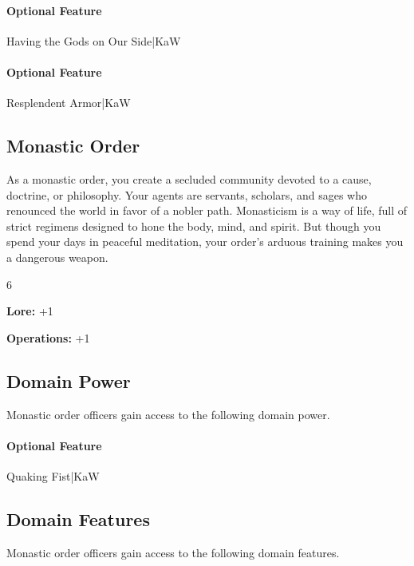\documentclass[10pt,a4paper,twoside,bg=print,twocolumn,openany,nodeprecatedcode]{dndbook}
\begin{document}
\paragraph{Optional Feature}
Having the Gods on Our Side|KaW

\paragraph{Optional Feature}
Resplendent Armor|KaW

\subsection{Monastic Order}
As a monastic order, you create a secluded community devoted to a cause, doctrine, or philosophy. Your agents are servants, scholars, and sages who renounced the world in favor of a nobler path. Monasticism is a way of life, full of strict regimens designed to hone the body, mind, and spirit. But though you spend your days in peaceful meditation, your order's arduous training makes you a dangerous weapon.

{\par \vspace { 9pt plus 3pt minus 3pt } \noindent  {} \nopagebreak }

\begin{itemize}
\begin{multicols}{6}
\item \textbf{Lore:} +1
\item \textbf{Operations:} +1
\end{multicols}

\end{itemize}

\subsection{Domain Power}
Monastic order officers gain access to the following domain power.

\paragraph{Optional Feature}
Quaking Fist|KaW

\subsection{Domain Features}
Monastic order officers gain access to the following domain features.
\end{document}
